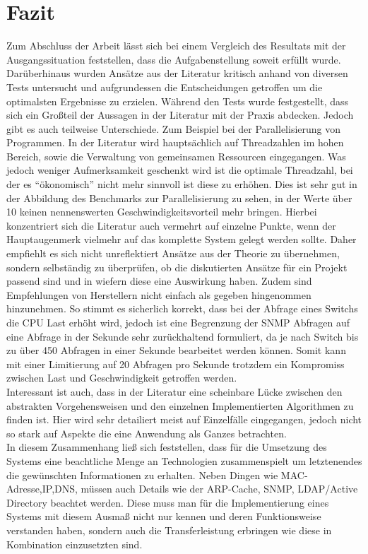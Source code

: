 \chapter{Fazit}
\label{cha:Fazit}

Zum Abschluss der Arbeit lässt sich bei einem Vergleich des Resultats mit der Ausgangssituation feststellen, dass die Aufgabenstellung soweit erfüllt wurde. Darüberhinaus wurden Ansätze aus der Literatur kritisch anhand von diversen Tests untersucht und aufgrundessen die Entscheidungen getroffen um die optimalsten Ergebnisse zu erzielen.
Während den Tests wurde festgestellt, dass sich ein Großteil der Aussagen in der Literatur mit der Praxis abdecken. Jedoch gibt es auch teilweise Unterschiede. Zum Beispiel bei der Parallelisierung von Programmen. In der Literatur wird hauptsächlich auf Threadzahlen im hohen Bereich, sowie die Verwaltung von gemeinsamen Ressourcen eingegangen. Was jedoch weniger Aufmerksamkeit geschenkt wird ist die optimale Threadzahl, bei der es “ökonomisch” nicht mehr sinnvoll ist diese zu erhöhen. Dies ist sehr gut in der Abbildung des Benchmarks zur Parallelisierung zu sehen, in der Werte über 10 keinen nennenswerten Geschwindigkeitsvorteil mehr bringen. Hierbei konzentriert sich die Literatur auch vermehrt auf einzelne Punkte, wenn der Hauptaugenmerk vielmehr auf das komplette System gelegt werden sollte. Daher empfiehlt es sich nicht unreflektiert Ansätze aus der Theorie zu übernehmen, sondern selbständig zu überprüfen, ob die diskutierten Ansätze für ein Projekt passend sind und in wiefern diese eine Auswirkung haben.
Zudem sind Empfehlungen von Herstellern nicht einfach als gegeben hingenommen hinzunehmen. So stimmt es sicherlich korrekt, dass bei der Abfrage eines Switchs die CPU Last erhöht wird, jedoch ist eine Begrenzung der SNMP Abfragen auf eine Abfrage in der Sekunde sehr zurückhaltend formuliert, da je nach Switch bis zu über 450 Abfragen in einer Sekunde bearbeitet werden können. Somit kann mit einer Limitierung auf 20 Abfragen pro Sekunde trotzdem ein Kompromiss zwischen Last und Geschwindigkeit getroffen werden.\\
Interessant ist auch, dass in der Literatur eine scheinbare Lücke zwischen den abstrakten Vorgehensweisen und den einzelnen Implementierten Algorithmen zu finden ist. Hier wird sehr detailiert meist auf Einzelfälle eingegangen, jedoch nicht so stark auf Aspekte die eine Anwendung als Ganzes betrachten.\\
In diesem Zusammenhang ließ sich feststellen, dass für die Umsetzung des Systems eine beachtliche Menge an Technologien zusammenspielt um letztenendes die gewünschten Informationen zu erhalten. Neben Dingen wie MAC-Adresse,IP,DNS, müssen auch Details wie der ARP-Cache, SNMP, LDAP/Active Directory beachtet werden. Diese muss man für die Implementierung eines Systems mit diesem Ausmaß nicht nur kennen und deren Funktionsweise verstanden haben, sondern auch die Transferleistung erbringen wie diese in Kombination einzusetzten sind.\\
